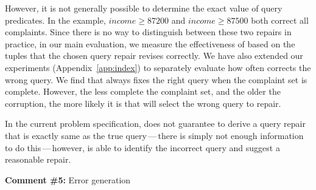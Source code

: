 However, it is not generally possible to determine the exact value of query
predicates. In the example, $income \geq 87200$ and $income \geq 87500$ both
correct all complaints. Since there is no way to distinguish between these two
repairs in practice, in our main evaluation, we measure the effectiveness of
\sys based on the tuples that the chosen query repair revises correctly. We
have also extended our experiments (Appendix~\ref{app:index}) to separately
evaluate how often \sys corrects the wrong query. We find that \sys always
fixes the right query when the complaint set is complete. However, the less
complete the complaint set, and the older the corruption, the more likely it
is that \sys will select the wrong query to repair.

In the current problem specification, \sys does not guarantee to derive a
query repair that is exactly same as the true query\,---\,there is simply not enough information to do this\,---\,however, \sys is able to
identify the incorrect query and suggest a reasonable repair.

% 
% 
% 

\comskip

\noindent
\textbf{Comment \#5:} Error generation
\begin{quote}
\end{quote}

